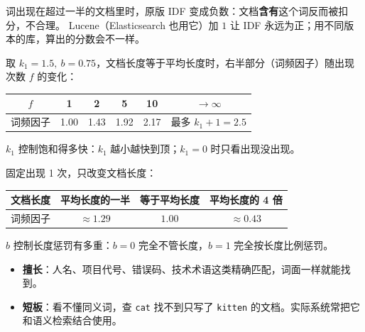 词出现在超过一半的文档里时，原版 IDF 变成负数：文档\textbf{含有}这个词反而被扣分，不合理。
Lucene（Elasticsearch 也用它）加 $1$ 让 IDF 永远为正；用不同版本的库，算出的分数会不一样。

取 $k_1 = 1.5,\ b = 0.75$，文档长度等于平均长度时，右半部分（词频因子）随出现次数 $f$ 的变化：

\begin{center}
\begin{tabular}{cccccc}
  \toprule
  $f$ & 1 & 2 & 5 & 10 & $\to\infty$ \\
  \midrule
  词频因子 & 1.00 & 1.43 & 1.92 & 2.17 & 最多 $k_1 + 1 = 2.5$ \\
  \bottomrule
\end{tabular}
\end{center}

$k_1$ 控制饱和得多快：$k_1$ 越小越快到顶；$k_1 = 0$ 时只看出现没出现。

固定出现 1 次，只改变文档长度：

\begin{center}
\begin{tabular}{cccc}
  \toprule
  文档长度 & 平均长度的一半 & 等于平均长度 & 平均长度的 4 倍 \\
  \midrule
  词频因子 & $\approx 1.29$ & $1.00$ & $\approx 0.43$ \\
  \bottomrule
\end{tabular}
\end{center}

$b$ 控制长度惩罚有多重：$b = 0$ 完全不管长度，$b = 1$ 完全按长度比例惩罚。

\begin{itemize}
  \item \textbf{擅长}：人名、项目代号、错误码、技术术语这类精确匹配，词面一样就能找到。
  \item \textbf{短板}：看不懂同义词，查 \texttt{cat} 找不到只写了 \texttt{kitten} 的文档。实际系统常把它和语义检索结合使用。
\end{itemize}
